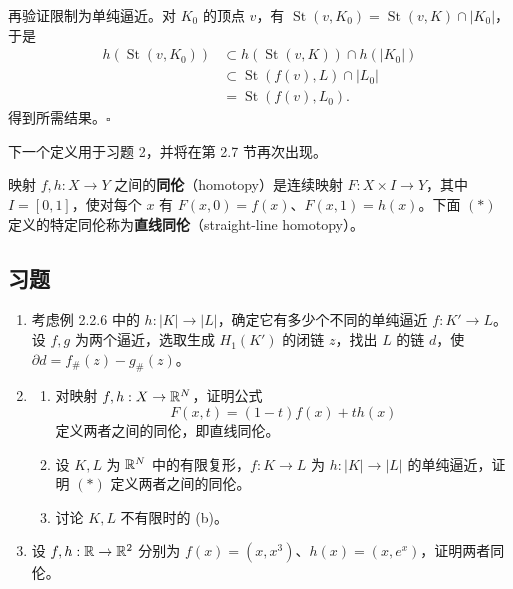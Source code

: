 再验证限制为单纯逼近。对 $K_0$ 的顶点 $v$，有 $\operatorname{St}(v,K_0)=\operatorname{St}(v,K)\cap|K_0|$，于是
\[
\begin{aligned}
h(\operatorname{St}(v,K_0))
&\subset h(\operatorname{St}(v,K))\cap h(|K_0|)\\
&\subset\operatorname{St}(f(v),L)\cap|L_0|\\
&=\operatorname{St}(f(v),L_0).
\end{aligned}
\]
得到所需结果。\hfill$\square$

下一个定义用于习题 2，并将在第 2.7 节再次出现。

映射 $f,h:X\to Y$ 之间的\textbf{同伦}（homotopy）是连续映射 $F:X\times I\to Y$，其中 $I=[0,1]$，使对每个 $x$ 有 $F(x,0)=f(x)$、$F(x,1)=h(x)$。下面 $(*)$ 定义的特定同伦称为\textbf{直线同伦}（straight-line homotopy）。

\subsection*{习题}
\begin{enumerate}
\item 考虑例 2.2.6 中的 $h:|K|\to|L|$，确定它有多少个不同的单纯逼近 $f:K'\to L$。设 $f,g$ 为两个逼近，选取生成 $H_1(K')$ 的闭链 $z$，找出 $L$ 的链 $d$，使 $\partial d=f_\#(z)-g_\#(z)$。
\item \begin{enumerate}[label=(\alph*)]
\item 对映射 $f,h:X\to\mathbb{R}^N$，证明公式
\[
F(x,t)=(1-t)f(x)+th(x)\tag{$*$}
\]
定义两者之间的同伦，即直线同伦。
\item 设 $K,L$ 为 $\mathbb{R}^N$ 中的有限复形，$f:K\to L$ 为 $h:|K|\to|L|$ 的单纯逼近，证明 $(*)$ 定义两者之间的同伦。
\item[\textasteriskcentered\,(c)] 讨论 $K,L$ 不有限时的 (b)。
\end{enumerate}
\item 设 $f,h:\mathbb{R}\to\mathbb{R}^2$ 分别为 $f(x)=(x,x^3)$、$h(x)=(x,e^x)$，证明两者同伦。
\end{enumerate}
